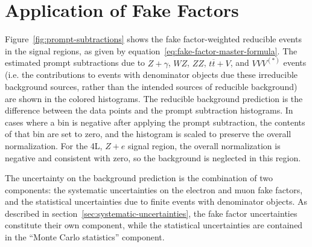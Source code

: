 \section{Application of Fake Factors}\label{sec:fake-factor-application}
Figure~\ref{fig:prompt-subtractions} shows the fake factor-weighted reducible events in the signal regions, as given by equation~\ref{eq:fake-factor-master-formula}. The estimated prompt subtractions due to $Z+\gamma$, $WZ$, $ZZ$, $t\overline{t}+V$, and $VVV^{(*)}$ events (i.e. the contributions to events with denominator objects due these irreducible background sources, rather than the intended sources of reducible background) are shown in the colored histograms. The reducible background prediction is the difference between the data points and the prompt subtraction histograms. In cases where a bin is negative after applying the prompt subtraction, the contents of that bin are set to zero, and the histogram is scaled to preserve the overall normalization. For the 4L, $Z+e$ signal region, the overall normalization is negative and consistent with zero, so the background is neglected in this region. 

The uncertainty on the background prediction is the combination of two components: the systematic uncertainties on the electron and muon fake factors, and the statistical uncertainties due to finite events with denominator objects. As described in section~\ref{sec:systematic-uncertainties}, the fake factor uncertainties constitute their own component, while the statistical uncertainties are contained in the ``Monte Carlo statistics'' component. 

